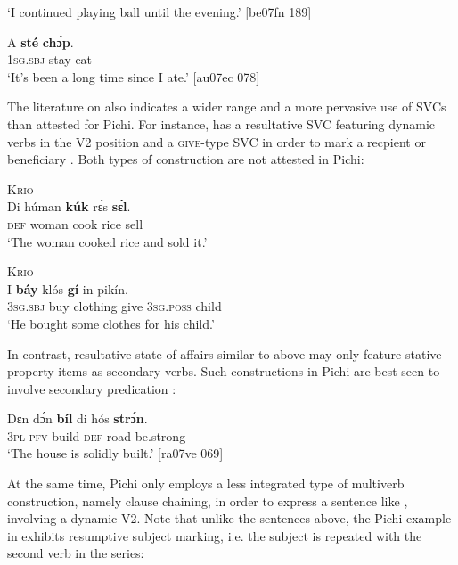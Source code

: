 \glt ‘I continued playing ball until the evening.’ [be07fn 189]
\z


\ea%
    \label{ex:1:17}
    \gll   A    \textbf{sté}  \textbf{chɔ́p}.\\
\textsc{1sg.sbj}  stay    eat\\

\glt ‘It’s been a long time since I ate.’ [au07ec 078]
\z

The literature on  also indicates a wider range and a more pervasive use of SVCs than attested for Pichi. For instance,  has a resultative SVC featuring dynamic verbs in the V2 position  and a \textsc{give}{}-type SVC in order to mark a recpient or beneficiary . Both types of construction are not attested in Pichi:


\ea%
    \label{ex:1:18}
\textsc{Krio}\\
    \gll   Di  húman  \textbf{kúk}    rɛ́s    \textbf{sɛ́l}.                  \\
    \textsc{def}  woman  cook  rice    sell\\
\glt ‘The woman cooked rice and sold it.’ \citep[72]{Finney2004}
\z

\ea%
    \label{ex:1:19}
\textsc{Krio}\\
    \gll   I    \textbf{báy}    klós    \textbf{gí}    in    pikín.\\
\textsc{3sg.sbj}  buy    clothing  give    \textsc{3sg.poss}  child\\

\glt ‘He bought some clothes for his child.’ \citep[72]{Finney2004}
\z

In contrast, resultative state of affairs similar to  above may only feature stative property items as secondary verbs. Such constructions in Pichi are best seen to involve secondary predication :


\ea%
    \label{ex:1:20}
    \gll   Dɛn    dɔ́n    \textbf{bíl}   di  hós    \textbf{strɔ́n}.\\
\textsc{3pl}    \textsc{pfv}    build  \textsc{def}  road    be.strong\\

\glt ‘The house is solidly built.’ [ra07ve 069]
\z

At the same time, Pichi only employs a less integrated type of multiverb construction, namely clause chaining, in order to express a sentence like , involving a dynamic V2. Note that unlike the  sentences above, the Pichi example in  exhibits resumptive subject marking, i.e. the subject is repeated with the second verb in the series: 


